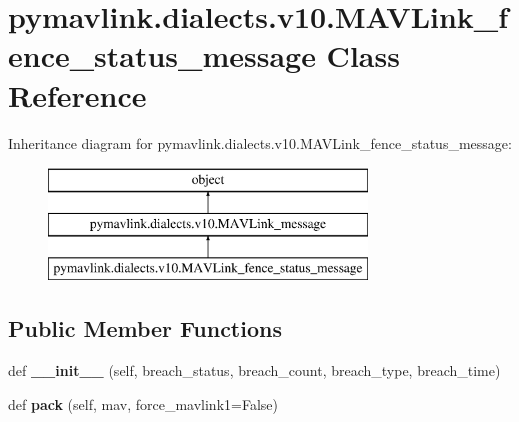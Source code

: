 \hypertarget{classpymavlink_1_1dialects_1_1v10_1_1MAVLink__fence__status__message}{}\section{pymavlink.\+dialects.\+v10.\+M\+A\+V\+Link\+\_\+fence\+\_\+status\+\_\+message Class Reference}
\label{classpymavlink_1_1dialects_1_1v10_1_1MAVLink__fence__status__message}
Inheritance diagram for pymavlink.\+dialects.\+v10.\+M\+A\+V\+Link\+\_\+fence\+\_\+status\+\_\+message\+:\begin{figure}[H]
\begin{center}
\leavevmode
\includegraphics[height=3.000000cm]{classpymavlink_1_1dialects_1_1v10_1_1MAVLink__fence__status__message}
\end{center}
\end{figure}
\subsection*{Public Member Functions}
\begin{DoxyCompactItemize}
\item 
\mbox{\label{classpymavlink_1_1dialects_1_1v10_1_1MAVLink__fence__status__message_aa6e6d77d12bc554c1a0495561350c912}} 
def {\bfseries \+\_\+\+\_\+init\+\_\+\+\_\+} (self, breach\+\_\+status, breach\+\_\+count, breach\+\_\+type, breach\+\_\+time)
\item 
\mbox{\label{classpymavlink_1_1dialects_1_1v10_1_1MAVLink__fence__status__message_aeb35303e8a558f6c69851140e8e4592f}} 
def {\bfseries pack} (self, mav, force\+\_\+mavlink1=False)
\end{DoxyCompactItemize}
